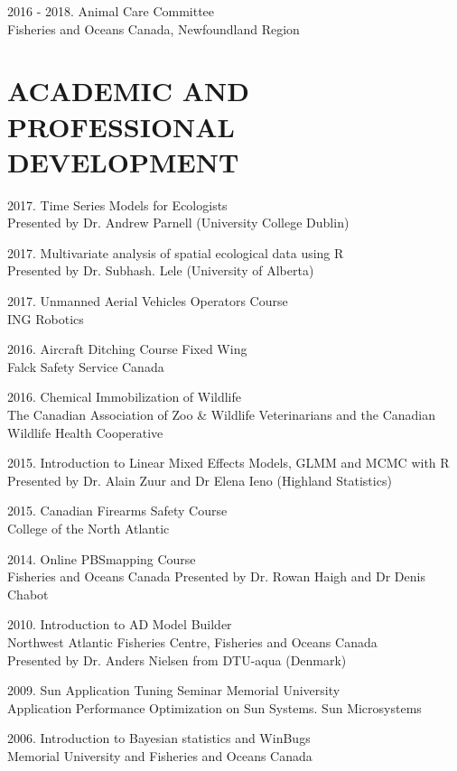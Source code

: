 \documentclass{res}
\begin{document}
\begin{resume}
\begin{hangparas}{.4in}{1}
2016 - 2018. Animal Care Committee\\
Fisheries and Oceans Canada, Newfoundland Region


\end{hangparas}
\section{ACADEMIC AND PROFESSIONAL DEVELOPMENT}
\vspace{0.2in}
\begin{hangparas}{.4in}{1}
2017. Time Series Models for Ecologists\\ 
Presented by Dr. Andrew Parnell (University College Dublin)

2017. Multivariate analysis of spatial ecological data using R\\
Presented by Dr. Subhash. Lele (University of Alberta)

2017. Unmanned Aerial Vehicles Operators Course\\ 
ING Robotics

2016. Aircraft Ditching Course Fixed Wing \\
Falck Safety Service Canada

2016. Chemical Immobilization of Wildlife\\
The Canadian Association of Zoo \& Wildlife Veterinarians and the Canadian Wildlife Health Cooperative

2015. Introduction to Linear Mixed Effects Models, GLMM and MCMC with R\\
Presented by Dr. Alain Zuur and Dr Elena Ieno (Highland Statistics)

2015. Canadian Firearms Safety Course\\
College of the North Atlantic

2014. Online PBSmapping  Course\\
Fisheries and Oceans Canada 
Presented by Dr. Rowan Haigh and Dr Denis Chabot

2010. Introduction to AD Model Builder\\
Northwest Atlantic Fisheries Centre, Fisheries and Oceans Canada \\
Presented by Dr. Anders Nielsen from DTU-aqua (Denmark)

2009. Sun Application Tuning Seminar
Memorial University\\
Application Performance Optimization on Sun Systems. Sun Microsystems

2006. Introduction to Bayesian statistics and WinBugs\\
Memorial University and Fisheries and Oceans Canada 


\end{hangparas}
\end{resume}
\end{document}
